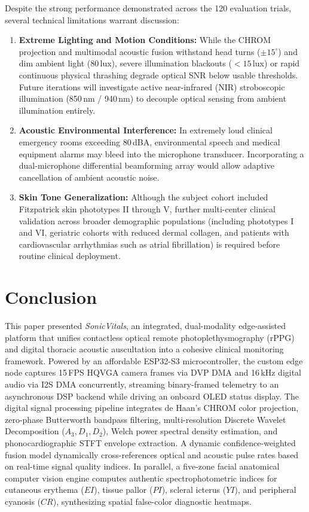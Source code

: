 \documentclass[journal]{IEEEtran}
\begin{document}
Despite the strong performance demonstrated across the 120 evaluation trials, several technical limitations warrant discussion:
\begin{enumerate}
    \item \textbf{Extreme Lighting and Motion Conditions:} While the CHROM projection and multimodal acoustic fusion withstand head turns ($\pm 15^\circ$) and dim ambient light (80\,lux), severe illumination blackouts ($<15$\,lux) or rapid continuous physical thrashing degrade optical SNR below usable thresholds. Future iterations will investigate active near-infrared (NIR) stroboscopic illumination (850\,nm / 940\,nm) to decouple optical sensing from ambient illumination entirely.
    \item \textbf{Acoustic Environmental Interference:} In extremely loud clinical emergency rooms exceeding 80\,dBA, environmental speech and medical equipment alarms may bleed into the microphone transducer. Incorporating a dual-microphone differential beamforming array would allow adaptive cancellation of ambient acoustic noise.
    \item \textbf{Skin Tone Generalization:} Although the subject cohort included Fitzpatrick skin phototypes II through V, further multi-center clinical validation across broader demographic populations (including phototypes I and VI, geriatric cohorts with reduced dermal collagen, and patients with cardiovascular arrhythmias such as atrial fibrillation) is required before routine clinical deployment.
\end{enumerate}

\section{Conclusion}

This paper presented \textit{SonicVitals}, an integrated, dual-modality edge-assisted platform that unifies contactless optical remote photoplethysmography (rPPG) and digital thoracic acoustic auscultation into a cohesive clinical monitoring framework. Powered by an affordable ESP32-S3 microcontroller, the custom edge node captures 15\,FPS HQVGA camera frames via DVP DMA and 16\,kHz digital audio via I2S DMA concurrently, streaming binary-framed telemetry to an asynchronous DSP backend while driving an onboard OLED status display. The digital signal processing pipeline integrates de Haan's CHROM color projection, zero-phase Butterworth bandpass filtering, multi-resolution Discrete Wavelet Decomposition ($A_3, D_1, D_2$), Welch power spectral density estimation, and phonocardiographic STFT envelope extraction. A dynamic confidence-weighted fusion model dynamically cross-references optical and acoustic pulse rates based on real-time signal quality indices. In parallel, a five-zone facial anatomical computer vision engine computes authentic spectrophotometric indices for cutaneous erythema ($EI$), tissue pallor ($PI$), scleral icterus ($YI$), and peripheral cyanosis ($CR$), synthesizing spatial false-color diagnostic heatmaps.
\end{document}
